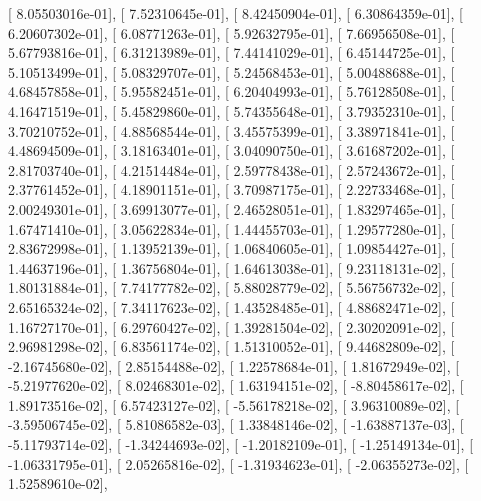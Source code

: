 \documentclass{article}
\begin{document}
       [  8.05503016e-01],
       [  7.52310645e-01],
       [  8.42450904e-01],
       [  6.30864359e-01],
       [  6.20607302e-01],
       [  6.08771263e-01],
       [  5.92632795e-01],
       [  7.66956508e-01],
       [  5.67793816e-01],
       [  6.31213989e-01],
       [  7.44141029e-01],
       [  6.45144725e-01],
       [  5.10513499e-01],
       [  5.08329707e-01],
       [  5.24568453e-01],
       [  5.00488688e-01],
       [  4.68457858e-01],
       [  5.95582451e-01],
       [  6.20404993e-01],
       [  5.76128508e-01],
       [  4.16471519e-01],
       [  5.45829860e-01],
       [  5.74355648e-01],
       [  3.79352310e-01],
       [  3.70210752e-01],
       [  4.88568544e-01],
       [  3.45575399e-01],
       [  3.38971841e-01],
       [  4.48694509e-01],
       [  3.18163401e-01],
       [  3.04090750e-01],
       [  3.61687202e-01],
       [  2.81703740e-01],
       [  4.21514484e-01],
       [  2.59778438e-01],
       [  2.57243672e-01],
       [  2.37761452e-01],
       [  4.18901151e-01],
       [  3.70987175e-01],
       [  2.22733468e-01],
       [  2.00249301e-01],
       [  3.69913077e-01],
       [  2.46528051e-01],
       [  1.83297465e-01],
       [  1.67471410e-01],
       [  3.05622834e-01],
       [  1.44455703e-01],
       [  1.29577280e-01],
       [  2.83672998e-01],
       [  1.13952139e-01],
       [  1.06840605e-01],
       [  1.09854427e-01],
       [  1.44637196e-01],
       [  1.36756804e-01],
       [  1.64613038e-01],
       [  9.23118131e-02],
       [  1.80131884e-01],
       [  7.74177782e-02],
       [  5.88028779e-02],
       [  5.56756732e-02],
       [  2.65165324e-02],
       [  7.34117623e-02],
       [  1.43528485e-01],
       [  4.88682471e-02],
       [  1.16727170e-01],
       [  6.29760427e-02],
       [  1.39281504e-02],
       [  2.30202091e-02],
       [  2.96981298e-02],
       [  6.83561174e-02],
       [  1.51310052e-01],
       [  9.44682809e-02],
       [ -2.16745680e-02],
       [  2.85154488e-02],
       [  1.22578684e-01],
       [  1.81672949e-02],
       [ -5.21977620e-02],
       [  8.02468301e-02],
       [  1.63194151e-02],
       [ -8.80458617e-02],
       [  1.89173516e-02],
       [  6.57423127e-02],
       [ -5.56178218e-02],
       [  3.96310089e-02],
       [ -3.59506745e-02],
       [  5.81086582e-03],
       [  1.33848146e-02],
       [ -1.63887137e-03],
       [ -5.11793714e-02],
       [ -1.34244693e-02],
       [ -1.20182109e-01],
       [ -1.25149134e-01],
       [ -1.06331795e-01],
       [  2.05265816e-02],
       [ -1.31934623e-01],
       [ -2.06355273e-02],
       [  1.52589610e-02],
\end{document}
